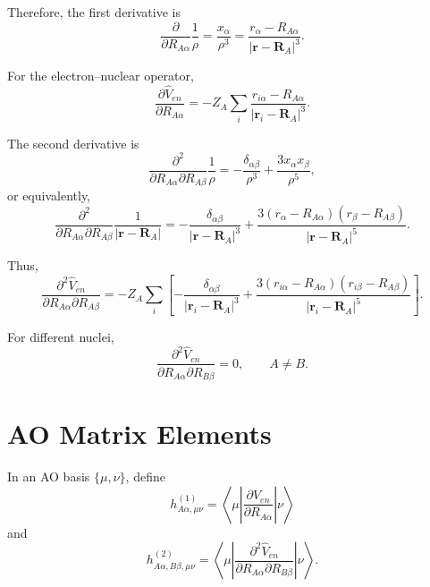 \documentclass[11pt]{article}
\begin{document}
Therefore, the first derivative is
\begin{equation}
\frac{\partial}{\partial R_{A\alpha}} \frac{1}{\rho}
=
\frac{x_\alpha}{\rho^3}
=
\frac{r_\alpha - R_{A\alpha}}{|\bm r-\bm R_A|^3}.
\end{equation}

For the electron--nuclear operator,
\begin{equation}
\frac{\partial \hat V_{en}}{\partial R_{A\alpha}}
=
- Z_A \sum_i \frac{r_{i\alpha}-R_{A\alpha}}{|\bm r_i-\bm R_A|^3}.
\end{equation}

The second derivative is
\begin{equation}
\frac{\partial^2}{\partial R_{A\alpha}\partial R_{A\beta}} \frac{1}{\rho}
=
-\frac{\delta_{\alpha\beta}}{\rho^3}
+
\frac{3 x_\alpha x_\beta}{\rho^5},
\end{equation}
or equivalently,
\begin{equation}
\frac{\partial^2}{\partial R_{A\alpha}\partial R_{A\beta}}
\frac{1}{|\bm r-\bm R_A|}
=
-\frac{\delta_{\alpha\beta}}{|\bm r-\bm R_A|^3}
+
\frac{3(r_\alpha-R_{A\alpha})(r_\beta-R_{A\beta})}{|\bm r-\bm R_A|^5}.
\end{equation}

Thus,
\begin{equation}
\frac{\partial^2 \hat V_{en}}
{\partial R_{A\alpha}\partial R_{A\beta}}
=
- Z_A \sum_i
\left[
-\frac{\delta_{\alpha\beta}}{|\bm r_i-\bm R_A|^3}
+
\frac{3(r_{i\alpha}-R_{A\alpha})(r_{i\beta}-R_{A\beta})}
{|\bm r_i-\bm R_A|^5}
\right].
\end{equation}

For different nuclei,
\begin{equation}
\frac{\partial^2 \hat V_{en}}
{\partial R_{A\alpha}\partial R_{B\beta}} = 0,
\qquad A \ne B.
\end{equation}

\section*{AO Matrix Elements}

In an AO basis $\{\mu,\nu\}$, define
\begin{equation}
h^{(1)}_{A\alpha,\mu\nu}
=
\left\langle \mu \left|
\frac{\partial \hat V_{en}}{\partial R_{A\alpha}}
\right| \nu \right\rangle
\end{equation}
and
\begin{equation}
h^{(2)}_{A\alpha,B\beta,\mu\nu}
=
\left\langle \mu \left|
\frac{\partial^2 \hat V_{en}}
{\partial R_{A\alpha}\partial R_{B\beta}}
\right| \nu \right\rangle.
\end{equation}
\end{document}
